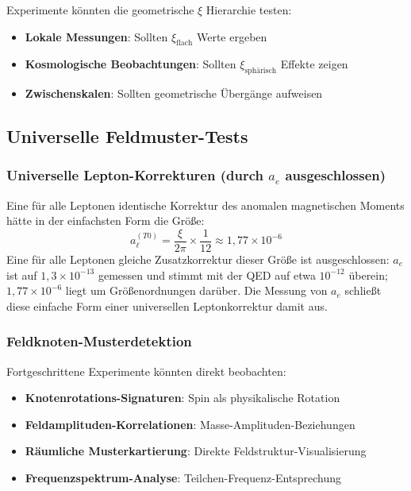 	Experimente könnten die geometrische $\xi$ Hierarchie testen:
	\begin{itemize}
		\item \textbf{Lokale Messungen}: Sollten $\xi_{\text{flach}}$ Werte ergeben
		\item \textbf{Kosmologische Beobachtungen}: Sollten $\xi_{\text{sphärisch}}$ Effekte zeigen
		\item \textbf{Zwischenskalen}: Sollten geometrische Übergänge aufweisen
	\end{itemize}
	
	\subsection{Universelle Feldmuster-Tests}
	\label{subsec:feldmuster_tests}
	
	\subsubsection{Universelle Lepton-Korrekturen (durch $a_e$ ausgeschlossen)}
	\label{subsubsec:universelle_lepton_korrekturen}
	
	Eine für alle Leptonen identische Korrektur des anomalen magnetischen Moments hätte in der einfachsten Form die Größe:
	\begin{equation}
		a_{\ell}^{(T0)} = \frac{\xi}{2\pi} \times \frac{1}{12} \approx 1{,}77 \times 10^{-6}
		\label{eq:universelle_lepton_vorhersage}
	\end{equation}
	Eine für alle Leptonen gleiche Zusatzkorrektur dieser Größe ist ausgeschlossen: $a_e$ ist auf $1{,}3\times10^{-13}$ gemessen und stimmt mit der QED auf etwa $10^{-12}$ überein; $1{,}77\times10^{-6}$ liegt um Größenordnungen darüber. Die Messung von $a_e$ schließt diese einfache Form einer universellen Leptonkorrektur damit aus.
	
	\subsubsection{Feldknoten-Musterdetektion}
	\label{subsubsec:knotenmuster_detektion}
	
	Fortgeschrittene Experimente könnten direkt beobachten:
	\begin{itemize}
		\item \textbf{Knotenrotations-Signaturen}: Spin als physikalische Rotation
		\item \textbf{Feldamplituden-Korrelationen}: Masse-Amplituden-Beziehungen
		\item \textbf{Räumliche Musterkartierung}: Direkte Feldstruktur-Visualisierung
		\item \textbf{Frequenzspektrum-Analyse}: Teilchen-Frequenz-Entsprechung
	\end{itemize}
	
